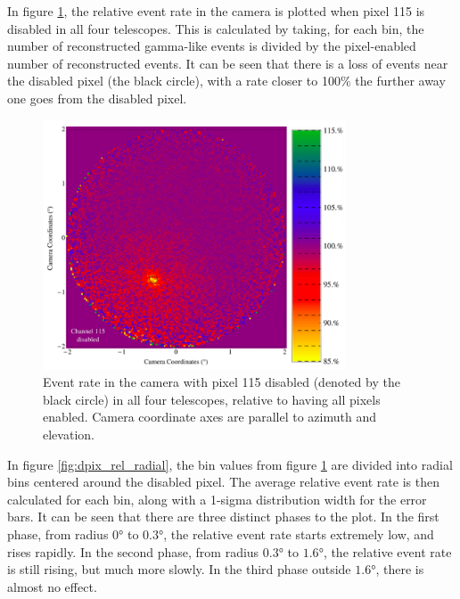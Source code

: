 In figure \ref{fig:dpix_rel_camera}, the relative event rate in the camera is plotted when pixel 115 is disabled in all four telescopes.
This is calculated by taking, for each bin, the number of reconstructed gamma-like events is divided by the pixel-enabled number of reconstructed events.
It can be seen that there is a loss of events near the disabled pixel (the black circle), with a rate closer to 100\% the further away one goes from the disabled pixel.

\begin{figure}[ht]
  \begin{center}
    \includegraphics[width=0.8\textwidth]{images/disabled_pixel/relativerate_camera}
    \caption[Relative Event Rate]{Event rate in the camera with pixel 115 disabled (denoted by the black circle) in all four telescopes, relative to having all pixels enabled.  Camera coordinate axes are parallel to azimuth and elevation.}\label{fig:dpix_rel_camera}
  \end{center}
\end{figure}

In figure \ref{fig:dpix_rel_radial}, the bin values from figure \ref{fig:dpix_rel_camera} are divided into radial bins centered around the disabled pixel.
The average relative event rate is then calculated for each bin, along with a 1-sigma distribution width for the error bars.
It can be seen that there are three distinct phases to the plot.
In the first phase, from radius $\ang{0}$ to $\ang{0.3}$, the relative event rate starts extremely low, and rises rapidly.
In the second phase, from radius $\ang{0.3}$ to $\ang{1.6}$, the relative event rate is still rising, but much more slowly.
In the third phase outside $\ang{1.6}$, there is almost no effect.


